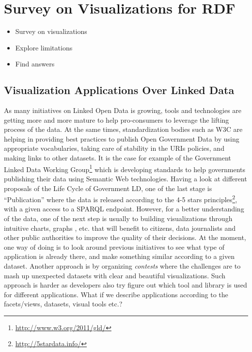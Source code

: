\chapter{Survey on Visualizations for RDF}
\label{ch:ch4}

\begin{itemize}
\item Survey on visualizations
\item Explore limitations
\item Find answers
\end{itemize}

\section{Visualization Applications Over Linked Data}
\label{sec:visAppsLD}

As many initiatives on Linked Open Data is growing, tools and technologies are getting more and more mature to help pro-consumers to leverage the lifting process of the data. At the same times, standardization bodies such as W3C are helping in providing best practices to publish Open Government Data by using appropriate vocabularies, taking care of stability in the URIs policies, and making links to other datasets. It is the case for example of the Government Linked Data Working Group\footnote{\url{http://www.w3.org/2011/gld/}} which is developing standards to help governments publishing their data using Semantic Web technologies. Having a look at different proposals of the Life Cycle of Government LD, one of the last stage is ``Publication'' where the data is released according to the 4-5 stars principles\footnote{\url{http://5stardata.info/}}, with a given access to a SPARQL endpoint. However, for a better understanding of the data, one of the next step is usually to building visualizations through intuitive charts, graphs , etc. that will benefit to citizens, data journalists and other public authorities to improve the quality of their decisions. At the moment, one way of doing is to look around previous initiatives to see what type of application is already there, and make something similar according to a given dataset. Another approach is by organizing \textit{contests} where the challenges are to mash up unexpected datasets with clear and beautiful visualizations. Such approach is harder as developers also try figure out which tool and library is used for different applications. What if we describe applications according to the facets/views, datasets, visual tools etc.? 

